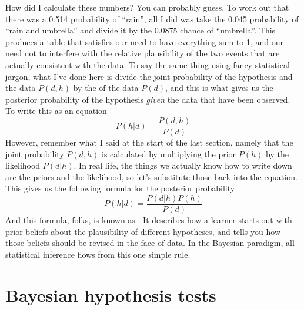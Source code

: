 How did I calculate these numbers? You can probably guess. To work out that there was a 0.514 probability of ``rain'', all I did was take the 0.045 probability of ``rain and umbrella'' and divide it by the 0.0875 chance of ``umbrella''. This produces a table that satisfies our need to have everything sum to 1, and our need not to interfere with the relative plausibility of the two events that are actually consistent with the data. To say the same thing using fancy statistical jargon, what I've done here is divide the joint probability of the hypothesis and the data $P(d,h)$ by the  of the data $P(d)$, and this is what gives us the posterior probability of the hypothesis {\it given} the data that have been observed. To write this as an equation 
$$
P(h | d) = \frac{P(d,h)}{P(d)}
$$
However, remember what I said at the start of the last section, namely that the joint probability $P(d,h)$ is calculated by multiplying the prior $P(h)$ by the likelihood $P(d|h)$. In real life, the things we actually know how to write down are the priors and the likelihood, so let's substitute those back into the equation. This gives us the following formula for the posterior probability
$$
P(h | d) = \frac{P(d|h) P(h)}{P(d)}
$$
And this formula, folks, is known as . It describes how a learner starts out with prior beliefs about the plausibility of different hypotheses, and tells you how those beliefs should be revised in the face of data. In the Bayesian paradigm, all statistical inference flows from this one simple rule.


\section{Bayesian hypothesis tests~\label{sec:bayesianhypothesistests}}

